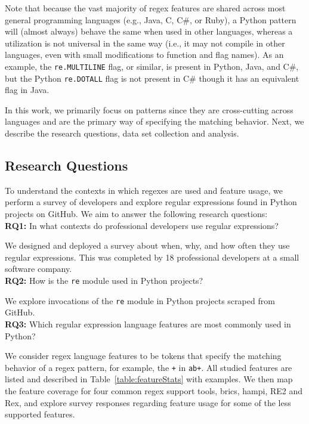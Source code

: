 Note that because the vast majority of regex features are shared across most general programming languages (e.g., Java, C, C\#, or Ruby), a Python {pattern} will (almost always) behave the same when used in other languages, whereas a utilization is not universal in the same way (i.e., it may not compile in other languages, even with small modifications to function and flag names).
As an example, the {\tt re.MULTILINE} flag, or similar, is present in Python, Java, and C\#, but  the Python {\tt re.DOTALL} flag is not present in C\# though it has an equivalent flag in Java.

In this work, we primarily focus on patterns since they are cross-cutting across languages and are the primary way of specifying the matching behavior. Next, we describe the research questions, data set collection and analysis.

\subsection{Research Questions}
\label{sec:rqs}
To understand the contexts in which regexes are used  and feature usage, we perform a survey of developers and explore regular expressions found in Python projects on GitHub. We aim to answer the following research questions:\\

\noindent \textbf{RQ1:} In what contexts do professional developers use regular expressions?

We designed and deployed a survey about when, why, and how often they use regular expressions. This was completed by 18 professional developers at a small software company.\\

\noindent \textbf{RQ2:} How  is the {\tt re} module used in Python projects?

We explore invocations of  the {\tt re} module in  Python projects scraped from GitHub.\\

\noindent \textbf{RQ3:} Which regular expression language features are most commonly used in Python?

We consider regex language features to be tokens that specify the matching behavior of a regex pattern, for example,  the {\tt +} in {\tt ab+}.  All studied features are listed and described in Table~\ref{table:featureStats} with examples. We then map the feature coverage for four common regex support tools, brics, hampi, RE2 and Rex, and explore survey responses regarding feature usage for some of the less supported features.\\

